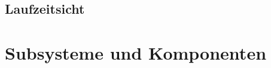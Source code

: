 \documentclass{article}
\begin{document}
\subsection{Laufzeitsicht}

\newpage

\section{Subsysteme und Komponenten}
\end{document}
